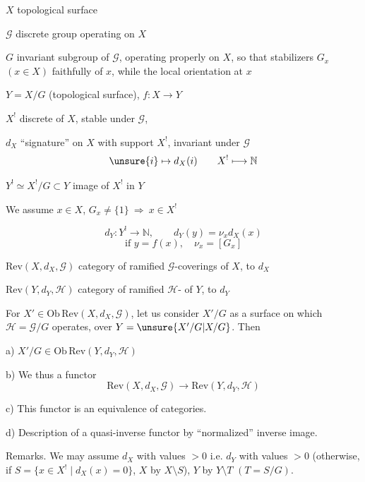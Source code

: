 
$X$ topological surface

$\mathcal G$ discrete group operating on $X$

$G$ invariant subgroup of $\mathcal G$, operating
properly on $X$, so that 
 stabilizers $G_x$ $(x\in X)$
 faithfully  of $x$, while
 the local orientation at $x$

$Y=X/G$ (topological surface), $f\colon X\to Y$

$X^{!}$ discrete  of $X$, stable under $\mathcal G$,

$d_X$ ``signature'' on $X$ with support $X^{!}$, invariant under $\mathcal G$
\[
\unsure{i}\mapsto d_X(i)
\qquad X^{!}\longmapsto\mathbb N
\]

$Y^{!}\simeq X^{!}/G\subset Y$ \quad image of $X^{!}$ in $Y$

We assume $x\in X$, $G_x\ne\{1\}\ \Rightarrow\ x\in X^{!}$

\[
d_Y\colon Y^{!}\to\mathbb N,\qquad d_Y(y)=\nu_x d_X(x)
\]
\[
\text{if } y=f(x),\quad \nu_x=[G_x]
\]

$\mathrm{Rev}(X,d_X,\mathcal G)$ category of ramified $\mathcal G$-coverings
of $X$,  to $d_X$

$\mathrm{Rev}(Y,d_Y,\mathcal H)$ category of ramified $\mathcal H$-
of $Y$,  to $d_Y$

For $X'\in\mathrm{Ob}\,\mathrm{Rev}(X,d_X,\mathcal G)$, let us consider
$X'/G$ as a surface on which
$\mathcal H=\mathcal G/G$ operates, over $Y=\unsure{X'/G|X/G}$. Then



 a) $X'/G\in\mathrm{Ob}\,\mathrm{Rev}(Y,d_Y,\mathcal H)$

 b) We thus  a functor
\[
\mathrm{Rev}(X,d_X,\mathcal G)\longrightarrow
\mathrm{Rev}(Y,d_Y,\mathcal H) \tag{19}
\]

 c) This functor is an equivalence of categories.

 d) Description of a quasi-inverse functor by ``normalized'' inverse image.

Remarks. We may assume $d_X$ with values $>0$ i.e. $d_Y$ with values
$>0$ (otherwise, if $S=\{x\in X^{!}\mid d_X(x)=0\}$, 
$X$ by $X\setminus S$), $Y$ by $Y\setminus T$ $(T=S/G)$.

